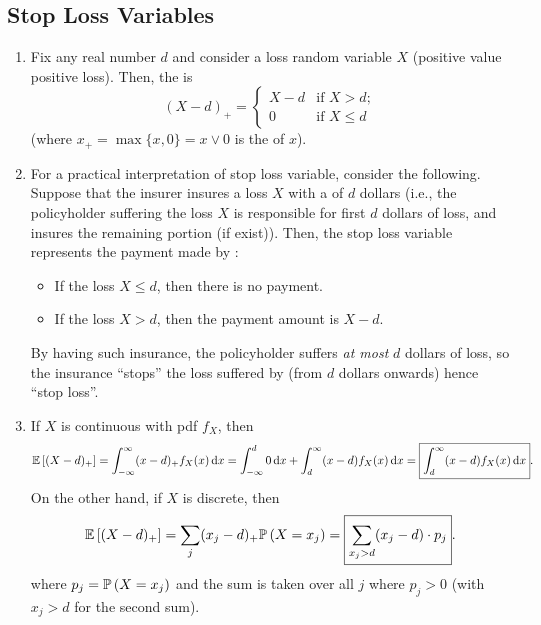 \subsection{Stop Loss Variables}
\begin{enumerate}
\item Fix any real number \(d\) and consider a loss  random
variable \(X\) (positive value  positive loss).  Then, the
 is 
\[
(X-d)_{+}=\begin{cases}
X-d&\text{if }X> d;\\
0&\text{if }X\le d
\end{cases}
\]
(where \(x_{+}=\max\{x,0\}=x\vee 0\) is the  of \(x\)).

\item For a practical interpretation of stop loss variable, consider the
following. Suppose that the insurer  insures a loss \(X\) with
a  of \(d\) dollars (i.e., the policyholder 
suffering the loss \(X\) is responsible for first \(d\) dollars of loss, and
 insures the remaining portion (if exist)). Then, the stop
loss variable represents the payment made by :
\begin{itemize}
\item If the loss \(X\le d\), then there is no payment.
\item If the loss \(X>d\), then the payment amount is \(X-d\).
\end{itemize}
\begin{note}
By having such insurance, the policyholder  suffers \emph{at most}
\(d\) dollars of loss, so the insurance ``stops'' the loss suffered by
 (from \(d\) dollars onwards)  hence ``stop
loss''.
\end{note}

\item \label{it:stop-loss-direct-exp-fmlas}
If \(X\) is continuous with pdf \(f_X\), then
\[
\mathbb{E}\left[(X-d)_{+}\right]=\int_{-\infty}^{\infty}(x-d)_{+}f_X(x)\dd{x}
=\int_{-\infty}^{d}0\dd{x}+\int_{d}^{\infty}(x-d)f_X(x)\dd{x}
=\boxed{\int_{d}^{\infty}(x-d)f_X(x)\dd{x}}.
\]
On the other hand, if \(X\) is discrete, then
\[
\mathbb{E}\left[(X-d)_{+}\right]=\sum_{j}^{}(x_j-d)_{+}\mathbb{P}\left(X=x_j\right)
=\boxed{\sum_{x_j>d}^{}(x_j-d)\cdot p_j}.
\]
where \(p_j=\mathbb{P}\left(X=x_j\right)\) and the sum is taken over all \(j\) where \(p_j>0\)
(with \(x_j>d\) for the second sum).


\end{enumerate}
